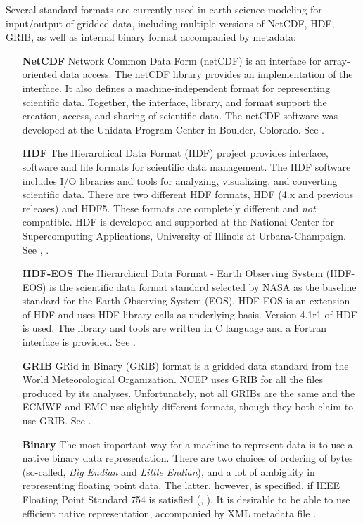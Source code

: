 Several standard formats are currently used in earth science modeling
for input/output of gridded data, including multiple versions of
NetCDF, HDF, GRIB, as well as internal binary format accompanied by
metadata:


\begin{itemize}
\item[\bf NetCDF] Network Common Data Form (netCDF) is an interface for 
array-oriented data access. The netCDF library provides an
implementation of the interface. It also defines a 
machine-independent format for representing scientific data. Together,
the interface, library, and format support the creation, access, and
sharing of scientific data. The netCDF software was developed at the
Unidata Program Center in Boulder, Colorado. See \cite{NetCDF3_UsersGuide_C}.

\item[\bf HDF] The Hierarchical Data Format (HDF) project provides
interface,  software and file formats for scientific data management. 
The HDF software includes I/O libraries and tools for analyzing,
visualizing, and converting scientific data. There are two different
HDF formats, HDF (4.x and previous releases) and HDF5. These formats
are completely different and {\it not} compatible. HDF is developed
and supported at the National Center for Supercomputing Applications,
University of Illinois at Urbana-Champaign. See
\cite{HDF4_tutorials}, \cite{HDF5_tutorial}.

\item[\bf HDF-EOS]  The Hierarchical Data Format - Earth Observing
System (HDF-EOS) is the scientific data format standard selected by
NASA as the baseline standard for the Earth Observing System (EOS). HDF-EOS
is an extension of HDF and uses HDF library calls as underlying
basis. Version 4.1r1 of HDF is used. The library and tools are written
in C language and a Fortran interface is provided. See \cite{HDF-EOS}.

\item[\bf GRIB] GRid in Binary (GRIB) format is a gridded data
standard from the World Meteorological Organization. NCEP uses GRIB
for all the files produced by its analyses. Unfortunately, not all
GRIBs are the same and the ECMWF and EMC use slightly different
formats, though they both claim to use GRIB. See \cite{GRIB_1}.


\item[\bf Binary]
The most important way for a machine to represent data is to use a
native binary data representation. There are  two choices of ordering of 
bytes (so-called, {\it Big Endian} and {\it Little Endian}), and a lot of
ambiguity in representing floating point data. The latter, however, is
specified, if IEEE Floating Point Standard 754 is satisfied 
(\cite{IEEE-Floating-Point}, \cite{Kahan-IEEE-754}). It is
desirable to be able to use efficient native representation,
accompanied by XML metadata file \cite{XML-W3C}. 
\end{itemize}

